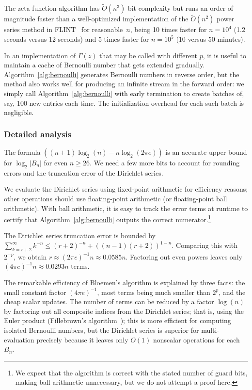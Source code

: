\documentclass[reqno]{amsart}
\newcommand{\bigOtilde}{\widetilde O}
\theoremstyle{definition}
\begin{document}
The zeta function algorithm has $\bigOtilde(n^3)$ bit complexity but
runs an order of magnitude faster than a well-optimized implementation of
the $\bigOtilde(n^2)$ power series method in FLINT~\cite{flint2021} for reasonable~$n$,
being 10 times faster
for $n = 10^4$ (1.2 seconds versus 12 seconds)
and 5 times faster for $n = 10^5$ (10 versus 50 minutes).

In an implementation of $\Gamma(z)$ that may be called
with different $p$, it is useful to maintain
a cache of Bernoulli number that gets extended gradually.
Algorithm~\ref{alg:bernoulli} generates
Bernoulli numbers in reverse order, but 
the method also works well for producing an infinite stream
in the forward order: we simply call
Algorithm~\ref{alg:bernoulli} with early termination
to create batches of, say, 100 new
entries each time. The initialization
overhead for each such batch is negligible.

\subsubsection{Detailed analysis}

The formula $((n+1) \log_2(n) - n \log_2(2 \pi e))$
is an accurate upper bound for $\log_2 |B_n|$ for even $n \ge 26$.
We need a few more bits to account for rounding errors and
the truncation error of the Dirichlet series.

We evaluate the Dirichlet series using fixed-point arithmetic for efficiency reasons;
other operations should use floating-point arithmetic (or floating-point ball arithmetic).
With ball arithmetic, it is easy to track the error terms
at runtime to certify that Algorithm~\ref{alg:bernoulli} outputs
the correct numerator.\footnote{We expect that the algorithm is correct with the stated
number of guard bits, making ball arithmetic unnecessary, but we do not attempt a proof here.}

The Dirichlet series truncation error is
bounded by $\sum_{k=r+2}^{\infty} k^{-n} \le (r+2)^{-n} + ((n-1) (r+2))^{1-n}$.
Comparing this with $2^{-p}$, we obtain $r \approx (2 \pi e)^{-1} n \approx 0.0585 n$.
Factoring out even powers leaves only $(4 \pi e)^{-1} n \approx 0.0293 n$ terms.

The remarkable efficiency of Bloemen's algorithm is explained by
three facts: the small constant factor $(4 \pi e)^{-1}$,
most terms being much smaller than $2^p$,
and the cheap scalar updates.
The number of terms can be reduced by a factor $\log(n)$ by factoring
out all composite indices from the Dirichlet series; that is,
using the Euler product (Fillebrown's algorithm~\cite{fillebrown1992faster});
this is more efficient for computing isolated Bernoulli numbers,
but the Dirichlet series is superior for multi-evaluation
precisely because it leaves only $O(1)$ nonscalar operations for each $B_n$.
\end{document}
